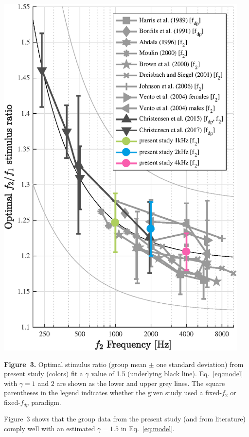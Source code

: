 \documentclass[paperwidth=100cm,paperheight=160cm,portrait,fontscale=0.2941]{baposter}
\begin{document}
\begin{poster}
{\begin{flushright}
\includegraphics[width=0.95\textwidth]{LiteraturDataComp.eps}
\end{flushright}
\vspace{-15pt}
\textbf{Figure~3.} Optimal stimulus ratio (group mean $\pm$ one standard deviation) from present study (colors) fit a $\gamma$ value of 1.5 (underlying black line). Eq.~\ref{eq:model} with $\gamma = 1$ and $2$ are shown as the lower and upper grey lines. The square parentheses in the legend indicates whether the given study used a fixed-$f_2$ or fixed-$f_{dp}$ paradigm.


Figure~3 shows that the group data from the present study (and from literature) comply well with an estimated $\gamma = 1.5$ in Eq.~\ref{eq:model}. 


}



\end{poster}
\end{document}
